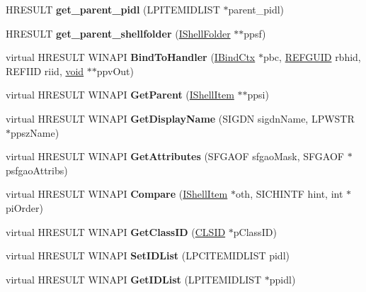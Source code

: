 \begin{DoxyCompactItemize}
\item 
\mbox{\label{class_c_shell_item_af2ab571ff089b00503f3ecf7086d1df4}} 
H\+R\+E\+S\+U\+LT {\bfseries get\+\_\+parent\+\_\+pidl} (L\+P\+I\+T\+E\+M\+I\+D\+L\+I\+ST $\ast$parent\+\_\+pidl)
\item 
\mbox{\label{class_c_shell_item_a945f6f174883abbb6ea3431f297dd39f}} 
H\+R\+E\+S\+U\+LT {\bfseries get\+\_\+parent\+\_\+shellfolder} (\hyperlink{interface_i_shell_folder}{I\+Shell\+Folder} $\ast$$\ast$ppsf)
\item 
\mbox{\label{class_c_shell_item_abcfb8060bea63a14f02ada90ed49df8b}} 
virtual H\+R\+E\+S\+U\+LT W\+I\+N\+A\+PI {\bfseries Bind\+To\+Handler} (\hyperlink{interface_i_bind_ctx}{I\+Bind\+Ctx} $\ast$pbc, \hyperlink{struct___g_u_i_d}{R\+E\+F\+G\+U\+ID} rbhid, R\+E\+F\+I\+ID riid, \hyperlink{interfacevoid}{void} $\ast$$\ast$ppv\+Out)
\item 
\mbox{\label{class_c_shell_item_a52bb34e92f74b6b469ab92d459888fac}} 
virtual H\+R\+E\+S\+U\+LT W\+I\+N\+A\+PI {\bfseries Get\+Parent} (\hyperlink{interface_i_shell_item}{I\+Shell\+Item} $\ast$$\ast$ppsi)
\item 
\mbox{\label{class_c_shell_item_a9d0e7b9e3129a2408a3ef4a2d688083c}} 
virtual H\+R\+E\+S\+U\+LT W\+I\+N\+A\+PI {\bfseries Get\+Display\+Name} (S\+I\+G\+DN sigdn\+Name, L\+P\+W\+S\+TR $\ast$ppsz\+Name)
\item 
\mbox{\label{class_c_shell_item_a9483e4d45e911b6e98afe60e948eb5a0}} 
virtual H\+R\+E\+S\+U\+LT W\+I\+N\+A\+PI {\bfseries Get\+Attributes} (S\+F\+G\+A\+OF sfgao\+Mask, S\+F\+G\+A\+OF $\ast$psfgao\+Attribs)
\item 
\mbox{\label{class_c_shell_item_a7c088cc813bf8100c27912ce373f8c89}} 
virtual H\+R\+E\+S\+U\+LT W\+I\+N\+A\+PI {\bfseries Compare} (\hyperlink{interface_i_shell_item}{I\+Shell\+Item} $\ast$oth, S\+I\+C\+H\+I\+N\+TF hint, int $\ast$pi\+Order)
\item 
\mbox{\label{class_c_shell_item_ae6251ae20ddf448897fddb5a92da648f}} 
virtual H\+R\+E\+S\+U\+LT W\+I\+N\+A\+PI {\bfseries Get\+Class\+ID} (\hyperlink{struct___i_i_d}{C\+L\+S\+ID} $\ast$p\+Class\+ID)
\item 
\mbox{\label{class_c_shell_item_a245560a50408e58994d45c311c3e0342}} 
virtual H\+R\+E\+S\+U\+LT W\+I\+N\+A\+PI {\bfseries Set\+I\+D\+List} (L\+P\+C\+I\+T\+E\+M\+I\+D\+L\+I\+ST pidl)
\item 
\mbox{\label{class_c_shell_item_acfd271f2220363d6e037820ee686a99f}} 
virtual H\+R\+E\+S\+U\+LT W\+I\+N\+A\+PI {\bfseries Get\+I\+D\+List} (L\+P\+I\+T\+E\+M\+I\+D\+L\+I\+ST $\ast$ppidl)
\end{DoxyCompactItemize}
